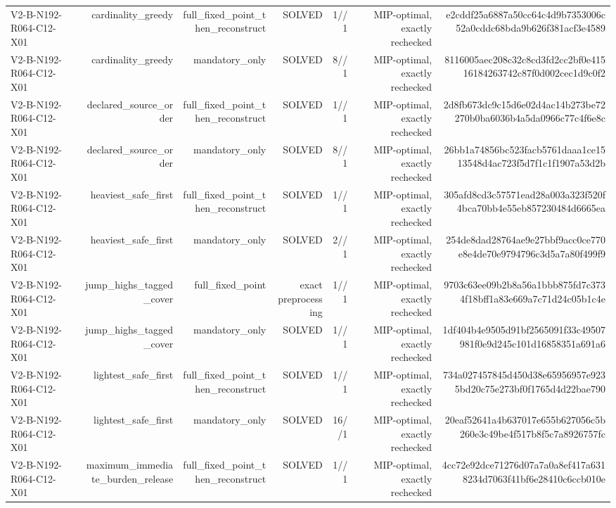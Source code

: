 {\begin{longtable}{lrrrrrr}
V2-B-N192-R064-C12-X01 & cardinality\_greedy & full\_fixed\_point\_then\_reconstruct & SOLVED & 1//1 & MIP-optimal, exactly rechecked & e2cddf25a6887a50cc64c4d9b7353006c52a0cddc68bda9b626f381acf3e4589 \\
V2-B-N192-R064-C12-X01 & cardinality\_greedy & mandatory\_only & SOLVED & 8//1 & MIP-optimal, exactly rechecked & 8116005aec208c32c8cd3fd2cc2bf0e41516184263742c87f0d002cec1d9c0f2 \\
V2-B-N192-R064-C12-X01 & declared\_source\_order & full\_fixed\_point\_then\_reconstruct & SOLVED & 1//1 & MIP-optimal, exactly rechecked & 2d8fb673dc9c15d6e02d4ac14b273be72270b0ba6036b4a5da0966c77c4f6e8c \\
V2-B-N192-R064-C12-X01 & declared\_source\_order & mandatory\_only & SOLVED & 8//1 & MIP-optimal, exactly rechecked & 26bb1a74856bc523facb5761daaa1ce1513548d4ac723f5d7f1c1f1907a53d2b \\
V2-B-N192-R064-C12-X01 & heaviest\_safe\_first & full\_fixed\_point\_then\_reconstruct & SOLVED & 1//1 & MIP-optimal, exactly rechecked & 305afd8cd3c57571ead28a003a323f520f4bca70bb4e55eb857230484d6665ea \\
V2-B-N192-R064-C12-X01 & heaviest\_safe\_first & mandatory\_only & SOLVED & 2//1 & MIP-optimal, exactly rechecked & 254de8dad28764ae9e27bbf9acc0ce770e8e4de70e9794796c3d5a7a80f499f9 \\
V2-B-N192-R064-C12-X01 & jump\_highs\_tagged\_cover & full\_fixed\_point & exact preprocessing & 1//1 & MIP-optimal, exactly rechecked & 9703c63ee09b2b8a56a1bbb875fd7c3734f18bff1a83e669a7c71d24c05b1c4e \\
V2-B-N192-R064-C12-X01 & jump\_highs\_tagged\_cover & mandatory\_only & SOLVED & 1//1 & MIP-optimal, exactly rechecked & 1df404b4e9505d91bf2565091f33c49507981f0e9d245c101d16858351a691a6 \\
V2-B-N192-R064-C12-X01 & lightest\_safe\_first & full\_fixed\_point\_then\_reconstruct & SOLVED & 1//1 & MIP-optimal, exactly rechecked & 734a027457845d450d38e65956957e9235bd20c75e273bf0f1765d4d22bae790 \\
V2-B-N192-R064-C12-X01 & lightest\_safe\_first & mandatory\_only & SOLVED & 16//1 & MIP-optimal, exactly rechecked & 20eaf52641a4b637017e655b627056c5b260e3c49be4f517b8f5c7a8926757fc \\
V2-B-N192-R064-C12-X01 & maximum\_immediate\_burden\_release & full\_fixed\_point\_then\_reconstruct & SOLVED & 1//1 & MIP-optimal, exactly rechecked & 4cc72e92dce71276d07a7a0a8ef417a6318234d7063f41bf6e28410c6ccb010e \\

\end{longtable}}
